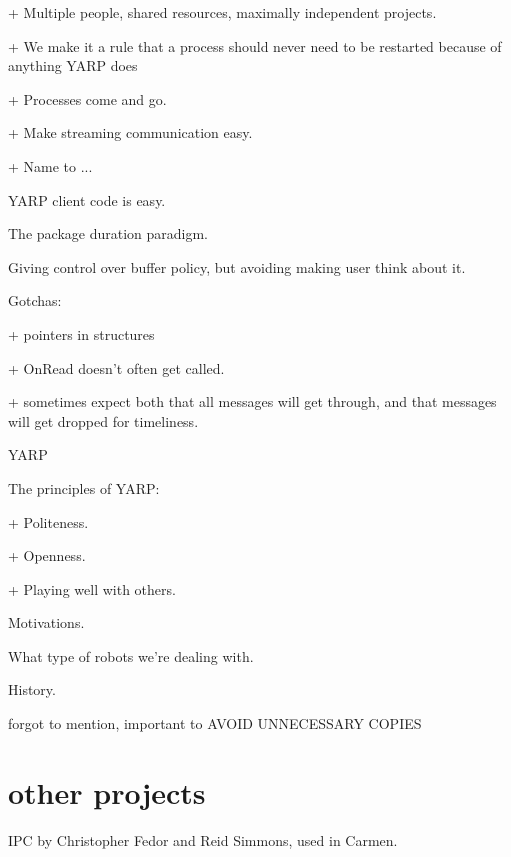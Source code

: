 

+ Multiple people, shared resources, maximally independent projects.

+ We make it a rule that a process should never need to be restarted
  because of anything YARP does

+ Processes come and go.

+ Make streaming communication easy.

+ Name to ...




YARP client code is easy.

The package duration paradigm.

Giving control over buffer policy, but avoiding making user
think about it.

Gotchas:

+ pointers in structures

+ OnRead doesn't often get called.

+ sometimes expect both that all messages will get through, and
  that messages will get dropped for timeliness.

YARP

The principles of YARP:

+ Politeness.

+ Openness.

+ Playing well with others.

Motivations.

What type of robots we're dealing with.

History.

forgot to mention, important to AVOID UNNECESSARY COPIES

\section{other projects}

IPC by Christopher Fedor and Reid Simmons, used in Carmen.

